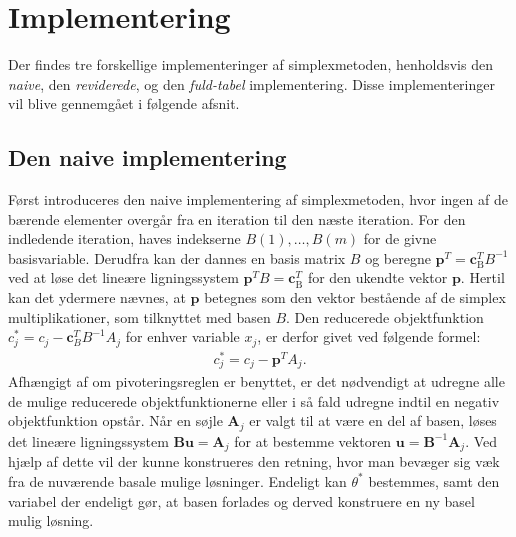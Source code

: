 %
\section{Implementering}
\label{julieergudesmuk}
Der findes tre forskellige implementeringer af simplexmetoden, henholdsvis den \textit{naive}, den \textit{reviderede}, og den \textit{fuld-tabel} implementering. Disse implementeringer vil blive gennemgået i følgende afsnit. 

\subsection{Den naive implementering}
Først introduceres den naive implementering af simplexmetoden, hvor ingen af de bærende elementer overgår fra en iteration til den næste iteration. 
For den indledende iteration, haves indekserne
$B(1),\ldots,B(m)$ for de givne basisvariable. 
Derudfra kan der dannes en basis matrix $B$ og beregne $\mathbf{p}^T=\mathbf{c}_{\text{B}}^T B^{-1}$ ved at løse det lineære ligningssystem $\mathbf{p}^T B=\mathbf{c}_{\text{B}}^T$ for den ukendte vektor $\mathbf{p}$. 
Hertil kan det ydermere nævnes, at $\mathbf{p}$ betegnes som den vektor bestående af de simplex multiplikationer, som tilknyttet med basen $B$. 
Den reducerede objektfunktion $c_j^* = c_j - \mathbf{c}_B^T B^{-1}A_j$ for enhver variable $x_j$, er derfor givet ved følgende formel:
%
\begin{align*}
c_j^* = c_j - \mathbf{p}^T A_j.
\end{align*}
%
Afhængigt af om pivoteringsreglen er benyttet, er det nødvendigt at udregne alle de mulige reducerede objektfunktionerne eller i så fald udregne indtil en negativ objektfunktion opstår. Når en søjle $\mathbf{A}_j$ er valgt til at være en del af basen, løses det lineære ligningssystem $\mathbf{Bu}=\mathbf{A}_j$ for at bestemme vektoren $\mathbf{u}=\mathbf{B}^{-1}\mathbf{A}_j$. Ved hjælp af dette vil der kunne konstrueres den retning, hvor man bevæger sig væk fra de nuværende basale mulige løsninger. Endeligt kan $\theta^*$ bestemmes, samt den variabel der endeligt gør, at basen forlades og derved konstruere en ny basel mulig løsning. \\\\
%
